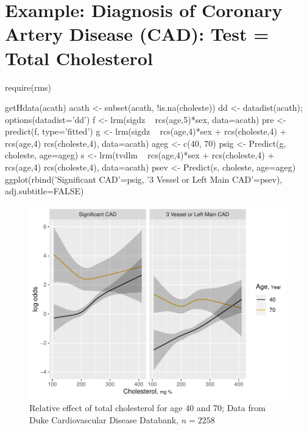 \section{Example: Diagnosis of Coronary Artery Disease (CAD): Test = Total
Cholesterol}
\begin{Schunk}
\begin{Sinput}
require(rms)
\end{Sinput}
\begin{Sinput}
getHdata(acath)
acath <- subset(acath, !is.na(choleste))
dd <- datadist(acath);  options(datadist='dd')
f <- lrm(sigdz ~ rcs(age,5)*sex, data=acath)
pre <- predict(f, type='fitted')
g <- lrm(sigdz ~ rcs(age,4)*sex + rcs(choleste,4) + rcs(age,4) %
         rcs(choleste,4), data=acath)
ageg <- c(40, 70)
psig <- Predict(g, choleste, age=ageg)
s <- lrm(tvdlm ~ rcs(age,4)*sex + rcs(choleste,4) + rcs(age,4) %
	rcs(choleste,4), data=acath)
psev <- Predict(s, choleste, age=ageg)
ggplot(rbind('Significant CAD'=psig, '3 Vessel or Left Main CAD'=psev),
	adj.subtitle=FALSE)
\end{Sinput}
\begin{figure}[htbp]

\centerline{\includegraphics[width=\maxwidth]{dx-du-1} }

\caption[Relative effect of total cholesterol for age 40 and 70]{Relative effect of total cholesterol for age 40 and 70; Data from Duke Cardiovascular Disease Databank, $n=2258$}\label{fig:dx-du}
\end{figure}
\end{Schunk}
\clearpage
